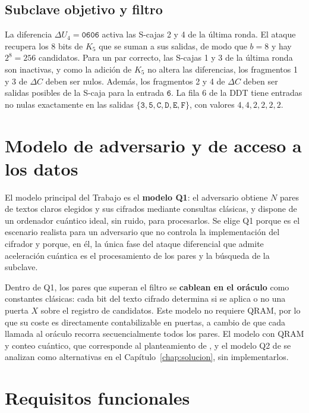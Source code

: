 \subsection{Subclave objetivo y filtro}

La diferencia \(\Delta U_4=\texttt{0606}\) activa las S-cajas 2 y 4 de la última ronda. El ataque recupera los 8 bits de \(K_5\) que se suman a sus salidas, de modo que \(b=8\) y hay \(2^8=256\) candidatos. Para un par correcto, las S-cajas 1 y 3 de la última ronda son inactivas, y como la adición de \(K_5\) no altera las diferencias, los fragmentos 1 y 3 de \(\Delta C\) deben ser nulos. Además, los fragmentos 2 y 4 de \(\Delta C\) deben ser salidas posibles de la S-caja para la entrada \(\texttt{6}\). La fila 6 de la DDT tiene entradas no nulas exactamente en las salidas \(\{\texttt{3},\texttt{5},\texttt{C},\texttt{D},\texttt{E},\texttt{F}\}\), con valores \(4,4,2,2,2,2\).

\section{Modelo de adversario y de acceso a los datos}
\label{sec:modelo}

El modelo principal del Trabajo es el \textbf{modelo Q1}: el adversario obtiene \(N\) pares de textos claros elegidos y sus cifrados mediante consultas clásicas, y dispone de un ordenador cuántico ideal, sin ruido, para procesarlos. Se elige Q1 porque es el escenario realista para un adversario que no controla la implementación del cifrador y porque, en él, la única fase del ataque diferencial que admite aceleración cuántica es el procesamiento de los pares y la búsqueda de la subclave.

Dentro de Q1, los pares que superan el filtro se \textbf{cablean en el oráculo} como constantes clásicas: cada bit del texto cifrado determina si se aplica o no una puerta \(X\) sobre el registro de candidatos. Este modelo no requiere QRAM, por lo que su coste es directamente contabilizable en puertas, a cambio de que cada llamada al oráculo recorra secuencialmente todos los pares. El modelo con QRAM y conteo cuántico, que corresponde al planteamiento de \citet{zhou2019}, y el modelo Q2 de \citet{kaplan2016diff} se analizan como alternativas en el Capítulo~\ref{chap:solucion}, sin implementarlos.

\section{Requisitos funcionales}

